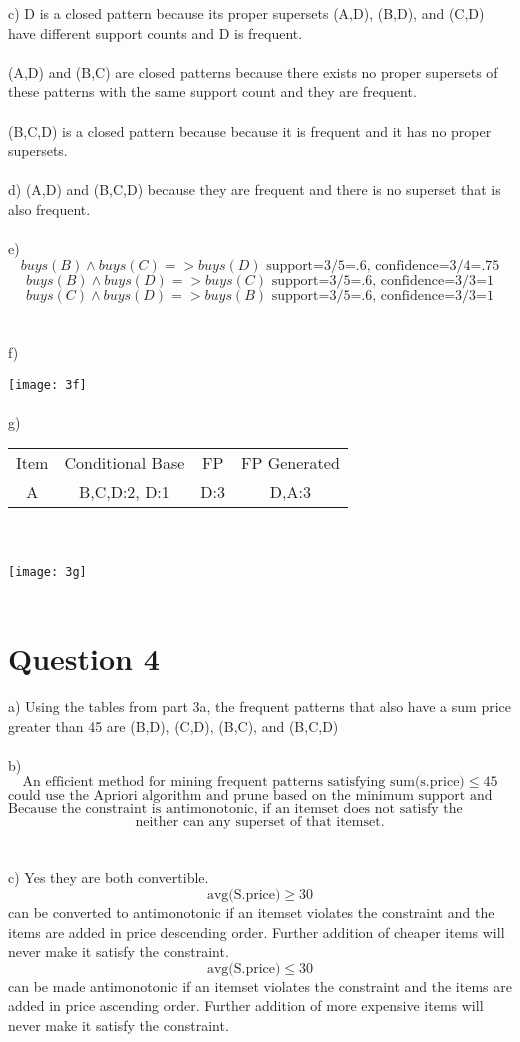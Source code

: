 \documentclass{article}
\begin{document}
c) D is a closed pattern because its proper supersets (A,D), (B,D), and (C,D) have different support counts and D is frequent.\\\\
(A,D) and (B,C) are closed patterns because there exists no proper supersets of these patterns with the same support count and they are frequent.\\\\
(B,C,D) is a closed pattern because because it is frequent and it has no proper supersets.\\\\
d) (A,D) and (B,C,D) because they are frequent and there is no superset that is also frequent.\\\\
e) $$buys(B) \wedge buys(C) => buys(D)\text{ support=3/5=.6, confidence=3/4=.75}$$
$$buys(B) \wedge buys(D) => buys(C)\text{ support=3/5=.6, confidence=3/3=1}$$
$$buys(C) \wedge buys(D) => buys(B)\text{ support=3/5=.6, confidence=3/3=1}$$\\\\
f)

\texttt{[image: 3f]}\\\\

g)
\begin{tabular}{ |c|c|c|c| }
 \hline
 Item & Conditional Base & FP & FP Generated \\
 A & {B,C,D:2}, {D:1} & {D:3} & {D,A:3} \\
 \hline
\end{tabular}\\\\
\texttt{[image: 3g]}\\\\
\section{Question 4}
a) Using the tables from part 3a, the frequent patterns that also have a sum price greater than 45 are (B,D), (C,D), (B,C), and (B,C,D)\\\\
b) $$\text{An efficient method for mining frequent patterns satisfying sum(s.price)}\leq45$$ $$\text{could use the Apriori algorithm and prune based on the minimum support and sum of the price at each level.}$$  $$\text{Because the constraint is antimonotonic, if an itemset does not satisfy the constaint,}$$ $$\text{neither can any superset of that itemset.}$$\\\\
c) Yes they are both convertible.  $$\text{avg(S.price)}\geq30$$ can be converted to antimonotonic if an itemset violates the constraint and the items are added in price descending order.  Further addition of cheaper items will never make it satisfy the constraint.\\
$$\text{avg(S.price)}\leq30$$ can be made antimonotonic if an itemset violates the constraint and the items are added in price ascending order.  Further addition of more expensive items will never make it satisfy the constraint.
\end{document}
